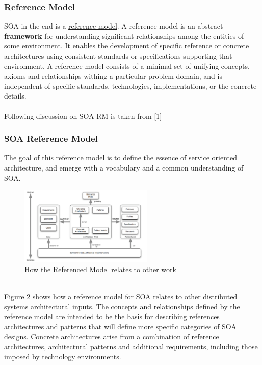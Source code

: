 \documentclass[10pt,a4paper]{article}
\begin{document}
\subsubsection{Reference Model}
SOA in the end is a \uline{reference model}. A reference model is an abstract \textbf{framework} for understanding significant relationships among the entities of some environment. It enables the development of specific reference or concrete architectures using consistent standards or specifications supporting that environment. A reference model consists of a minimal set of unifying concepts, axioms and relationships withing a particular problem domain, and is independent of specific standards, technologies, implementations, or the concrete details. \\ \\
Following discussion on SOA RM is taken from [1]
\subsubsection{SOA Reference Model}
The goal of this reference model is to define the essence of service oriented architecture, and emerge with a vocabulary and a common understanding of SOA. 
\begin{figure}[h!]
 \hfill \includegraphics[width=180pt]{images/soa-rm}\hspace*{\fill}
  \caption{How the Referenced Model relates to other work}
  \label{fig:soa-rm}
\end{figure}  \\
Figure 2 shows how a reference model for SOA relates to other distributed systems architectural inputs. The concepts and relationships defined by the reference model are intended to be the basis for describing references architectures and patterns that will define more specific categories of SOA designs. Concrete architectures arise from a combination of reference architectures, architectural patterns and additional requirements, including those imposed by technology environments.
\end{document}
